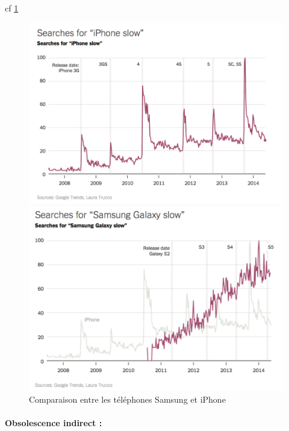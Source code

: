 cf \ref{compSamsIph}
\begin{figure}[h]

\begin{minipage}{0.5\linewidth}
\includegraphics[scale=0.25]{Rsc/searchForIphoneSlow.png} 
\end{minipage}
\begin{minipage}{0.5\linewidth}
\includegraphics[scale=0.25]{Rsc/searchForSamsungSlow.png} 
\end{minipage}
\caption{Comparaison entre les téléphones Samsung et iPhone}
\label{compSamsIph}
\end{figure}

\paragraph*{Obsolescence indirect :}

